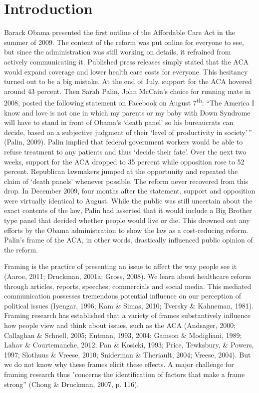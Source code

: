 \documentclass[12pt,econ]{sources/authesis}
\begin{document}
\hypertarget{framing-intro}{%
\section{Introduction}\label{framing-intro}}

Barack Obama presented the first outline of the Affordable Care Act in the summer of 2009. The content of the reform was put online for everyone to see, but since the administration was still working on details, it refrained from actively communicating it. Published press releases simply stated that the ACA would expand coverage and lower health care costs for everyone. This hesitancy turned out to be a big mistake. At the end of July, support for the ACA hovered around 43 percent. Then Sarah Palin, John McCain's choice for running mate in 2008, posted the following statement on Facebook on August 7\textsuperscript{th}: ``The America I know and love is not one in which my parents or my baby with Down Syndrome will have to stand in front of Obama's `death panel' so his bureaucrats can decide, based on a subjective judgment of their `level of productivity in society'\,'' (Palin, 2009). Palin implied that federal government workers would be able to refuse treatment to any patients and thus `decide their fate'. Over the next two weeks, support for the ACA dropped to 35 percent while opposition rose to 52 percent. Republican lawmakers jumped at the opportunity and repeated the claim of `death panels' whenever possible. The reform never recovered from this drop. In December 2009, four months after the statement, support and opposition were virtually identical to August. While the public was still uncertain about the exact contents of the law, Palin had asserted that it would include a Big Brother type panel that decided whether people would live or die. This drowned out any efforts by the Obama administration to show the law as a cost-reducing reform. Palin's frame of the ACA, in other words, drastically influenced public opinion of the reform.

Framing is the practice of presenting an issue to affect the way people see it (Aaroe, 2011; Druckman, 2001a; Gross, 2008). We learn about healthcare reform through articles, reports, speeches, commercials and social media. This mediated communication possesses tremendous potential influence on our perception of political issues (Iyengar, 1996; Kam \& Simas, 2010; Tversky \& Kahneman, 1981). Framing research has established that a variety of frames substantively influence how people view and think about issues, such as the ACA (Andsager, 2000; Callaghan \& Schnell, 2005; Entman, 1993, 2004; Gamson \& Modigliani, 1989; Lahav \& Courtemanche, 2012; Pan \& Kosicki, 1993; Price, Tewksbury, \& Powers, 1997; Slothuus \& Vreese, 2010; Sniderman \& Theriault, 2004; Vreese, 2004). But we do not know why these frames elicit these effects. A major challenge for framing research thus "concerns the identification of factors that make a frame strong'' (Chong \& Druckman, 2007, p. 116).
\end{document}

